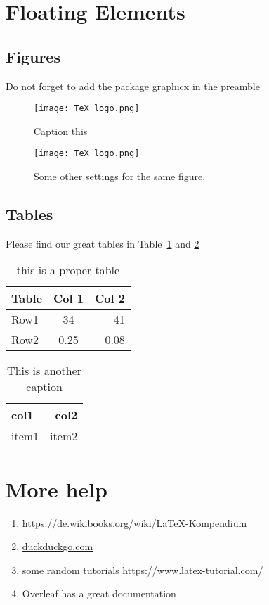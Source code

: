 \section*{Floating Elements}

\subsection{Figures}\label{figures}
Do not forget to add the package graphicx in the preamble


\begin{figure}[!ht]
\centering
\texttt{[image: TeX\_logo.png]} 
\caption{Caption this}
\label{fig:my_label} %
\end{figure}

\begin{figure}[!ht]
\centering
\texttt{[image: TeX\_logo.png]} 
\caption{Some other settings for the same figure.}
\label{fig:my_second_figure} %
\end{figure}




\subsection{Tables}\label{table}
Please find our great tables in Table~\ref{table1} and \ref{table_other}
\begin{table}[ht]
    \centering %
    \begin{tabular}{ | l || c | r | } %
        \hline
        Table & Col 1 & Col 2 \\ 
        \hline 
        Row1 & 34 & 41 \\ 
        \hline
        Row2 & 0.25 & 0.08 \\
        \hline
    \end{tabular}
    \caption{this is a proper table}
    \label{table1}
\end{table}

\begin{table}
    \begin{tabular*}{\textwidth}{ | l | r | } 
        \hline
        col1 & col2 \\
        \hline
        item1 & item2 \\ 
        \hline 
    \end{tabular*}
    \caption{This is another caption}
    \label{table_other}
\end{table}


\section{More help}
\begin{enumerate}
    \item \url{https://de.wikibooks.org/wiki/LaTeX-Kompendium}
    \item \url{duckduckgo.com}
    \item some random tutorials \url{https://www.latex-tutorial.com/}
    \item Overleaf has a great documentation
\end{enumerate}
